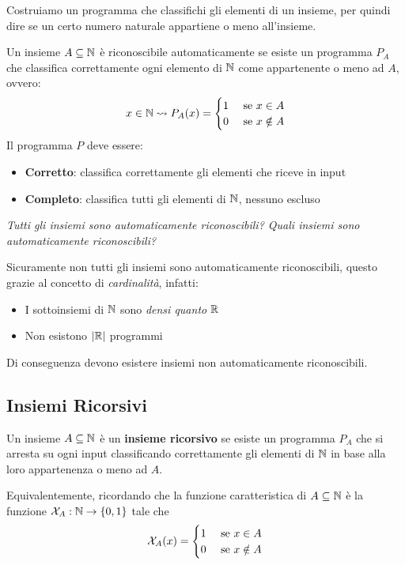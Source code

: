 Costruiamo un programma che classifichi gli elementi di un insieme, per quindi dire se un certo numero naturale appartiene o meno all'insieme.

Un insieme $A \subseteq \mathbb{N}$ è riconoscibile automaticamente se esiste un programma $P_A$ che classifica correttamente ogni elemento di $\mathbb{N}$ come appartenente o meno ad $A$, ovvero:
$$
x \in \mathbb{N} \rightsquigarrow P_A (x) = \begin{cases}
	1 & \text{ se } x \in A \\
	0 & \text{ se } x \notin A
\end{cases}
$$
Il programma $P$ deve essere:
\begin{itemize}
	\item \textbf{Corretto}: classifica correttamente gli elementi che riceve in input
    
	\item \textbf{Completo}: classifica  tutti gli elementi di $\mathbb{N}$, nessuno escluso
\end{itemize}

\textit{Tutti gli insiemi sono automaticamente riconoscibili? Quali insiemi sono automaticamente riconoscibili?}

Sicuramente non tutti gli insiemi sono automaticamente riconoscibili, questo grazie al concetto di \textit{cardinalità}, infatti:
\begin{itemize}
	\item I sottoinsiemi di $\mathbb{N}$ sono \textit{densi quanto} $\mathbb{R}$
    
	\item Non esistono $|\mathbb{R}|$ programmi
\end{itemize}
Di conseguenza devono esistere insiemi non automaticamente riconoscibili.

\subsection{Insiemi Ricorsivi}

Un insieme $A \subseteq \mathbb{N}$ è un \textbf{insieme ricorsivo} se esiste un programma $P_A$ che si arresta su ogni input classificando correttamente gli elementi di $\mathbb{N}$ in base alla loro appartenenza o meno ad $A$.

Equivalentemente, ricordando che la funzione caratteristica di $A \subseteq \mathbb{N}$ è la funzione $ \mathcal{X}_A : \mathbb{N} \rightarrow \{0,1\} $ tale che
$$
\mathcal{X}_A (x) = \begin{cases}
	1 & \text{ se } x \in A \\
	0 & \text{ se } x \notin A
\end{cases}
$$

